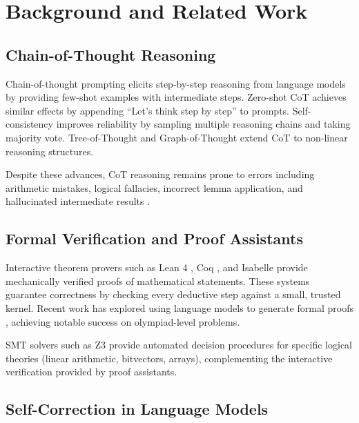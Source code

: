 \documentclass[11pt,a4paper]{article}
\begin{document}
\section{Background and Related Work}
\label{sec:background}

\subsection{Chain-of-Thought Reasoning}

Chain-of-thought prompting \citep{wei2022chain} elicits step-by-step reasoning from language models by providing few-shot examples with intermediate steps. Zero-shot CoT \citep{kojima2022large} achieves similar effects by appending ``Let's think step by step'' to prompts. Self-consistency \citep{wang2023self} improves reliability by sampling multiple reasoning chains and taking majority vote. Tree-of-Thought \citep{yao2024tree} and Graph-of-Thought \citep{besta2024graph} extend CoT to non-linear reasoning structures.

Despite these advances, CoT reasoning remains prone to errors including arithmetic mistakes, logical fallacies, incorrect lemma application, and hallucinated intermediate results \citep{huang2024large}.

\subsection{Formal Verification and Proof Assistants}

Interactive theorem provers such as Lean 4 \citep{moura2021lean}, Coq \citep{bertot2013interactive}, and Isabelle \citep{paulson1994isabelle} provide mechanically verified proofs of mathematical statements. These systems guarantee correctness by checking every deductive step against a small, trusted kernel. Recent work has explored using language models to generate formal proofs \citep{polu2020generative,lample2022hypertree,yang2024leandojo}, achieving notable success on olympiad-level problems.

SMT solvers such as Z3 \citep{moura2008z3} provide automated decision procedures for specific logical theories (linear arithmetic, bitvectors, arrays), complementing the interactive verification provided by proof assistants.

\subsection{Self-Correction in Language Models}
\end{document}
